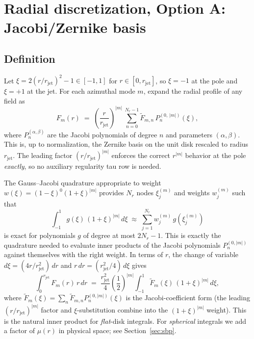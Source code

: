 \documentclass[11pt]{article}
\newcommand{\rjet}{r_{\mathrm{jet}}}
\begin{document}
\section{Radial discretization, Option A: Jacobi/Zernike basis}
\label{sec:radialA}

\subsection{Definition}

Let $\xi = 2(r/\rjet)^{2} - 1 \in [-1, 1]$ for $r \in [0, \rjet]$, so
$\xi = -1$ at the pole and $\xi = +1$ at the jet.  For each azimuthal
mode $m$, expand the radial profile of any field as
\begin{equation}
  \boxed{\;\;
  F_{m}(r) \;=\; \left(\frac{r}{\rjet}\right)^{|m|}\,
  \sum_{n=0}^{N_{r}-1} \widetilde{F}_{m,n}\,
  P_{n}^{(0,\,|m|)}(\xi),
  \;\;}
  \label{eq:Jacobi-basis}
\end{equation}
where $P_{n}^{(\alpha,\beta)}$ are the Jacobi polynomials of degree $n$
and parameters $(\alpha, \beta)$.  This is, up to normalization, the
Zernike basis on the unit disk rescaled to radius $\rjet$.  The leading
factor $(r/\rjet)^{|m|}$ enforces the correct $r^{|m|}$ behavior at
the pole \emph{exactly}, so no auxiliary regularity tau row is needed.

The Gauss--Jacobi quadrature appropriate to weight $w(\xi) =
(1-\xi)^{0}(1+\xi)^{|m|}$ provides $N_{r}$ nodes $\xi_{j}^{(m)}$ and
weights $w_{j}^{(m)}$ such that
\begin{equation}
  \int_{-1}^{1} g(\xi)\,(1+\xi)^{|m|}\,d\xi
  \;\approx\; \sum_{j=1}^{N_{r}} w_{j}^{(m)}\,g(\xi_{j}^{(m)})
\end{equation}
is exact for polynomials $g$ of degree at most $2N_{r} - 1$.  This is
exactly the quadrature needed to evaluate inner products of the
Jacobi polynomials $P_{n}^{(0,|m|)}$ against themselves with the
right weight.  In terms of $r$, the change of variable
$d\xi = (4 r/\rjet^{2})\,dr$ and $r\,dr = (\rjet^{2}/4)\,d\xi$ gives
\begin{equation}
  \int_{0}^{\rjet} F_{m}(r)\,r\,dr
  \;=\; \frac{\rjet^{2}}{4}\!\left(\frac{1}{2}\right)^{|m|}
  \int_{-1}^{1} \widetilde{F}_{m}(\xi)\,(1+\xi)^{|m|}\,d\xi,
\end{equation}
where $\widetilde{F}_{m}(\xi) = \sum_{n} \widetilde{F}_{m,n}
P_{n}^{(0,|m|)}(\xi)$ is the Jacobi-coefficient form (the leading
$(r/\rjet)^{|m|}$ factor and $\xi$-substitution combine into the
$(1+\xi)^{|m|}$ weight).  This is the natural inner product for
\emph{flat}-disk integrals.  For \emph{spherical} integrals we add a
factor of $\mu(r)$ in physical space; see Section~\ref{sec:sbp}.
\end{document}
